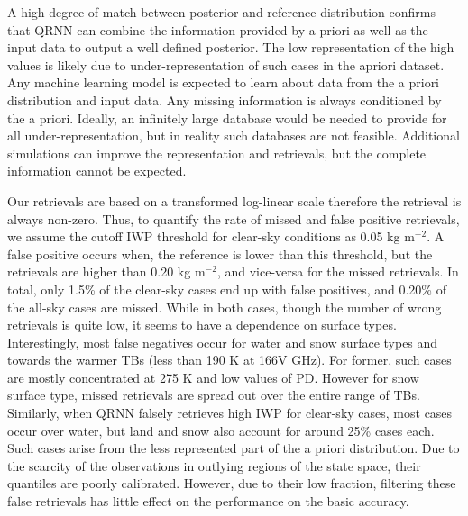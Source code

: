 \documentclass[amt, manuscript]{copernicus}
\begin{document}
A high degree of match between posterior and reference distribution confirms that QRNN can combine the information provided by a priori as well as the input data to output a well defined posterior. The low representation of the high values is likely due to under-representation of such cases in the apriori dataset. Any machine learning model is expected to learn about data from the a priori distribution and input data. Any missing information is always conditioned by the a priori. Ideally, an infinitely large database would be needed to provide for all under-representation, but in reality such databases are not feasible. Additional simulations can improve the representation and retrievals, but the complete information cannot be expected. 


Our retrievals are based on a transformed log-linear scale therefore the retrieval is always non-zero. Thus, to quantify the rate of missed  and false positive retrievals, we assume the cutoff IWP threshold for clear-sky conditions as 0.05\,\,kg m$^{-2}$. A false positive occurs when, the reference is lower than this threshold, but the retrievals are higher than 0.20\,\,kg m$^{-2}$, and vice-versa for the missed retrievals. In total, only 1.5\% of the clear-sky cases end up with false positives, and 0.20\% of the all-sky cases are missed. While in both cases, though the number of wrong retrievals is quite low, it seems to have a dependence on surface types. Interestingly, most false negatives occur for water and snow surface types and towards the warmer TBs (less than 190\,\,K at 166V GHz). For former, such cases are mostly concentrated at 275\,\,K and low values of PD.  However for snow surface type, missed retrievals are spread out over the entire range of TBs. Similarly, when QRNN falsely retrieves high IWP for clear-sky cases, most cases occur over water, but land and snow also account for around 25\% cases each. Such cases arise from the less represented part of the a priori distribution. Due to the scarcity of the observations in outlying regions of the state space, their quantiles are poorly calibrated. However, due to their low fraction, filtering these false retrievals has little effect on the performance on the basic accuracy. 




 
\end{document}
